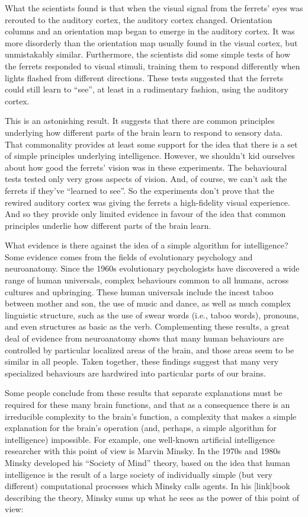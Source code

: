 \documentclass[a4paper,twoside,10pt]{book}
\begin{document}
What the scientists found is that when the visual signal from the ferrets' eyes was rerouted to the auditory cortex, the auditory cortex changed. Orientation columns and an orientation map began to emerge in the auditory cortex. It was more disorderly than the orientation map usually found in the visual cortex, but unmistakably similar. Furthermore, the scientists did some simple tests of how the ferrets responded to visual stimuli, training them to respond differently when lights flashed from different directions. These tests suggested that the ferrets could still learn to ``see'', at least in a rudimentary fashion, using the auditory cortex.

This is an astonishing result. It suggests that there are common principles underlying how different parts of the brain learn to respond to sensory data. That commonality provides at least some support for the idea that there is a set of simple principles underlying intelligence. However, we shouldn't kid ourselves about how good the ferrets' vision was in these experiments. The behavioural tests tested only very gross aspects of vision. And, of course, we can't ask the ferrets if they've ``learned to see''. So the experiments don't prove that the rewired auditory cortex was giving the ferrets a high-fidelity visual experience. And so they provide only limited evidence in favour of the idea that common principles underlie how different parts of the brain learn.

What evidence is there against the idea of a simple algorithm for intelligence? Some evidence comes from the fields of evolutionary psychology and neuroanatomy. Since the 1960s evolutionary psychologists have discovered a wide range of human universals, complex behaviours common to all humans, across cultures and upbringing. These human universals include the incest taboo between mother and son, the use of music and dance, as well as much complex linguistic structure, such as the use of swear words (i.e., taboo words), pronouns, and even structures as basic as the verb. Complementing these results, a great deal of evidence from neuroanatomy shows that many human behaviours are controlled by particular localized areas of the brain, and those areas seem to be similar in all people. Taken together, these findings suggest that many very specialized behaviours are hardwired into particular parts of our brains.

Some people conclude from these results that separate explanations must be required for these many brain functions, and that as a consequence there is an irreducible complexity to the brain's function, a complexity that makes a simple explanation for the brain's operation (and, perhaps, a simple algorithm for intelligence) impossible. For example, one well-known artificial intelligence researcher with this point of view is Marvin Minsky. In the 1970s and 1980s Minsky developed his ``Society of Mind'' theory, based on the idea that human intelligence is the result of a large society of individually simple (but very different) computational processes which Minsky calls agents. In his [link]book describing the theory, Minsky sums up what he sees as the power of this point of view:
\end{document}
